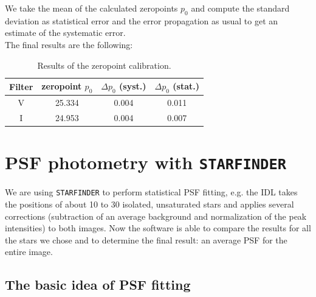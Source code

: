 We take the mean of the calculated zeropoints $p_0$ and compute the standard deviation as statistical error  and the error propagation as usual to get an estimate of the systematic error. \\
The final results are the following:

\begin{table}[H]
\setlength{\tabcolsep}{5mm}
\setlength\extrarowheight{2mm}
\centering
\begin{tabular}{c| c c c}

Filter  & zeropoint $p_0$ & $\Delta p_0$ (syst.) & $\Delta p_0$ (stat.) \\ \hline 

V & 25.334 & 0.004 & 0.011 \\
I & 24.953 & 0.004 & 0.007 \\

\end{tabular}
\caption{Results of the zeropoint calibration.}
\end{table}

\section{PSF photometry with \texttt{STARFINDER}}
We are using \texttt{STARFINDER} to perform statistical PSF fitting, e.g. the IDL takes the positions of about 10 to 30 isolated, unsaturated stars and applies several corrections (subtraction of an average background and normalization of the peak intensities) to both images. Now the software is able to compare the results for all the stars we chose and to determine the final result: an average PSF for the entire image.
\subsection{The basic idea of PSF fitting}

